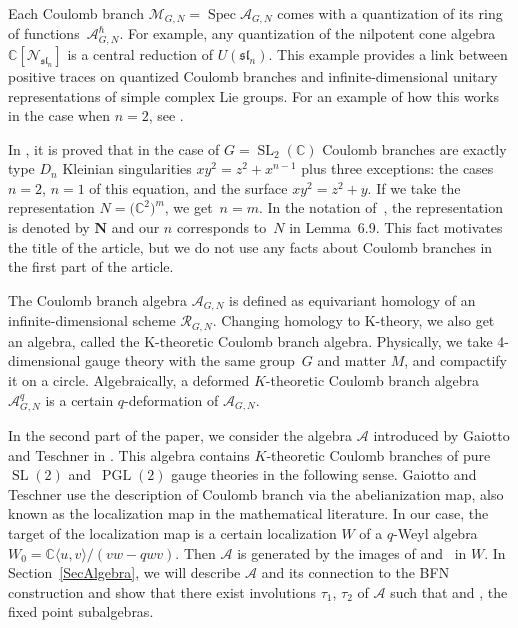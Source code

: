 \documentclass[pdftex]{sigma}
\newcommand\CC{\mathbb{C}}
\DeclareMathOperator\SL{SL}
\newcommand{\mc}{\mathcal}
\newcommand{\PGL}{\operatorname{PGL}}
\numberwithin{equation}{section}
\theoremstyle{definition}
\begin{document}
Each Coulomb branch $\mc{M}_{G,N}=\operatorname{Spec} \mc{A}_{G,N}$ comes with a quantization of its ring of functions~$\mc{A}_{G,N}^{\hbar}$. For example, any quantization of the nilpotent cone algebra $\CC[\mc{N}_{\mathfrak{sl}_n}]$ is a central reduction of $U(\mathfrak{sl}_n)$. This example provides a link between positive traces on quantized Coulomb branches and infinite-dimensional unitary representations of simple complex Lie groups. For an example of how this works in the case when $n=2$, see \cite[Section~4.3, pages~43 and~46]{klyuev2023unitarizability}.

In \cite[Lemma~6.9]{BFN}, it is proved that in the case of $G=\SL_2(\CC)$ Coulomb branches are exactly type $D_n$ Kleinian singularities $xy^2=z^2+x^{n-1}$ plus three exceptions: the cases $n=2$, $n=1$ of this equation, and the surface $xy^2=z^2+y$. If we take the representation $N=\bigl(\CC^2\bigr)^m$, we get~${n=m}$. In the notation of~\cite{BFN}, the representation is denoted by $\mathbf{N}$ and our $n$ corresponds to~$N$ in Lemma~6.9.
This fact motivates the title of the article, but we do not use any facts about Coulomb branches in the first part of the article.

The Coulomb branch algebra $\mc{A}_{G,N}$ is defined as equivariant homology of an infinite-dimen\-sion\-al scheme $\mc{R}_{G,N}$. Changing homology to K-theory, we also get an algebra, called the K-theoretic Coulomb branch algebra. Physically, we take 4-dimensional gauge theory with the same group~$G$ and matter $M$, and compactify it on a circle. Algebraically, a deformed $K$-theoretic Coulomb branch algebra $\mc{A}_{G,N}^q$ is a certain $q$-deformation of $\mc{A}_{G,N}$.

In the second part of the paper, we consider the algebra $\mc{A}$ introduced by Gaiotto and Teschner in \cite[Section~3.5]{GT}. This algebra contains $K$-theoretic Coulomb branches of pure~$\SL(2)$ and~$\PGL(2)$ gauge theories in the following sense. Gaiotto and Teschner use the description of Coulomb branch via the abelianization map, also known as the localization map in the mathematical literature. In our case, the target of the localization map is a certain localization $W$ of a $q$-Weyl algebra $W_0=\CC\langle u,v\rangle/(vw-qwv)$. Then $\mc{A}$ is generated by the images of \smash{$\mc{A}_{\SL(2),0}^q$} and~\smash{$\mc{A}_{\PGL(2),0}^q$} in $W$. In Section~\ref{SecAlgebra}, we will describe $\mc{A}$ and its connection to the BFN construction and show that there exist involutions $\tau_1$, $\tau_2$ of $\mc{A}$ such that \smash{$\mc{A}_{SL(2),0}^q=\mc{A}^{\tau_1}$} and \smash{$\mc{A}_{\PGL(2),0}^q=\mc{A}^{\tau_2}$}, the fixed point subalgebras.
\end{document}
